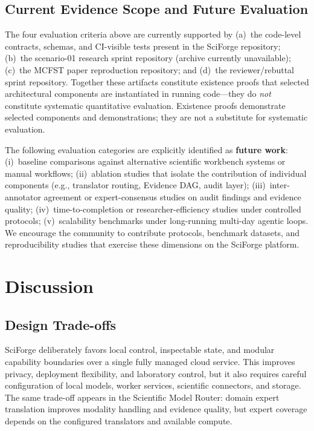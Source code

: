 \documentclass[sn-basic,Numbered,pdflatex]{sn-jnl}
\begin{document}
\subsection{Current Evidence Scope and Future Evaluation}

The four evaluation criteria above are currently supported by (a)~the code-level contracts, schemas, and CI-visible tests present in the SciForge repository; (b)~the scenario-01 research sprint repository (archive currently unavailable); (c)~the MCFST paper reproduction repository; and (d)~the reviewer/rebuttal sprint repository. Together these artifacts constitute existence proofs that selected architectural components are instantiated in running code---they do \emph{not} constitute systematic quantitative evaluation. Existence proofs demonstrate selected components and demonstrations; they are not a substitute for systematic evaluation.

The following evaluation categories are explicitly identified as \textbf{future work}: (i)~baseline comparisons against alternative scientific workbench systems or manual workflows; (ii)~ablation studies that isolate the contribution of individual components (e.g., translator routing, Evidence DAG, audit layer); (iii)~inter-annotator agreement or expert-consensus studies on audit findings and evidence quality; (iv)~time-to-completion or researcher-efficiency studies under controlled protocols; (v)~scalability benchmarks under long-running multi-day agentic loops. We encourage the community to contribute protocols, benchmark datasets, and reproducibility studies that exercise these dimensions on the SciForge platform.


\section{Discussion}

\subsection{Design Trade-offs}

SciForge deliberately favors local control, inspectable state, and modular capability boundaries over a single fully managed cloud service. This improves privacy, deployment flexibility, and laboratory control, but it also requires careful configuration of local models, worker services, scientific connectors, and storage. The same trade-off appears in the Scientific Model Router: domain expert translation improves modality handling and evidence quality, but expert coverage depends on the configured translators and available compute.
\end{document}
